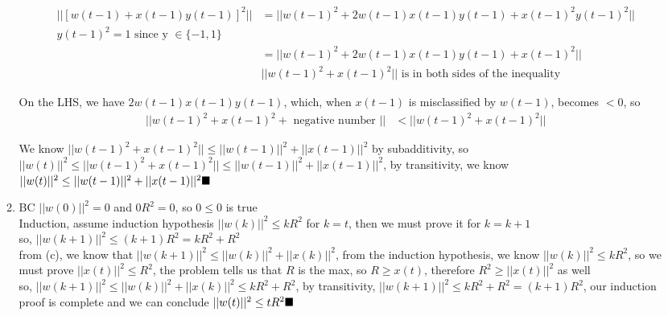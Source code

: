 \documentclass{article}
\begin{document}
\begin{enumerate}
\begin{enumerate}[label=(\alph*)]
            \begin{align*}
                ||[w(t-1) + x(t-1)y(t-1)]^2|| &= ||w(t-1)^2 + 2w(t-1)x(t-1)y(t-1) + x(t-1)^2y(t-1)^2||\\
                y(t-1)^2 = 1 \text{ since y } \in\{-1, 1\}\\
                &=||w(t-1)^2 + 2w(t-1)x(t-1)y(t-1) + x(t-1)^2||\\
                &||w(t-1)^2+x(t-1)^2|| \text{ is in both sides of the inequality}
            \end{align*}

            On the LHS, we have $2w(t-1)x(t-1)y(t-1)$, which, when $x(t-1)$ is misclassified by $w(t-1)$, becomes $<0$, so
            \begin{align*}
                ||w(t-1)^2 + x(t-1)^2 + \text{ negative number }|| &<||w(t-1)^2+x(t-1)^2||
            \end{align*}
            
            We know $||w(t-1)^2 + x(t-1)^2|| \leq ||w(t-1)||^2 + ||x(t-1)||^2$ by subadditivity, so $||w(t)||^2 \leq ||w(t-1)^2 + x(t-1)^2|| \leq ||w(t-1)||^2 + ||x(t-1)||^2$, by transitivity, we know \\ $||w(t)||^2 \leq ||w(t-1)||^2 + ||x(t-1)||^2 \hfill \blacksquare$
        
            \item BC $||w(0)||^2 = 0$ and $0R^2 = 0$, so $0 \leq 0$ is true\\[0.25in]
            Induction, assume induction hypothesis $||w(k)||^2 \leq kR^2$ for $k = t$, then we must prove it for $k = k + 1$\\[0.25in]
            so, $||w(k+1)||^2 \leq (k+1)R^2 = kR^2 + R^2$\\[0.25in]
            from (c), we know that $||w(k+1)||^2 \leq ||w(k)||^2 + ||x(k)||^2$, from the induction hypothesis, we know $||w(k)||^2 \leq kR^2$, so we must prove $||x(t)||^2 \leq R^2$, the problem tells us that $R$ is the max, so $R \geq x(t)$, therefore $R^2 \geq ||x(t)||^2$ as well\\[0.25in]
            so, $||w(k+1)||^2 \leq ||w(k)||^2 + ||x(k)||^2 \leq kR^2 + R^2$, by transitivity, $||w(k+1)||^2 \leq kR^2 + R^2 = (k + 1)R^2$, our induction proof is complete and we can conclude $||w(t)||^2 \leq tR^2 \hfill \blacksquare$
            

\end{enumerate}
\end{enumerate}
\end{document}
